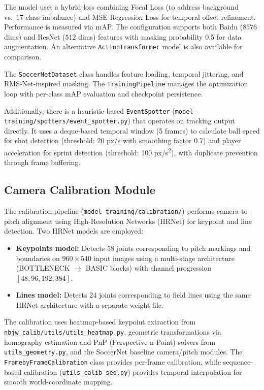 \documentclass[10pt,twocolumn,a4paper]{article}
\begin{document}
The model uses a hybrid loss combining Focal Loss (to address background vs.\ 17-class imbalance) and MSE Regression Loss for temporal offset refinement. Performance is measured via mAP. The configuration supports both Baidu ($8576$ dims) and ResNet ($512$ dims) features with masking probability 0.5 for data augmentation. An alternative \texttt{ActionTransformer} model is also available for comparison.

The \texttt{SoccerNetDataset} class handles feature loading, temporal jittering, and RMS-Net-inspired masking. The \texttt{TrainingPipeline} manages the optimization loop with per-class mAP evaluation and checkpoint persistence.

Additionally, there is a heuristic-based \texttt{EventSpotter} (\texttt{model-training/spotters/event\_spotter.py}) that operates on tracking output directly. It uses a deque-based temporal window (5 frames) to calculate ball speed for shot detection (threshold: 20 px/s with smoothing factor 0.7) and player acceleration for sprint detection (threshold: 100 px/s\textsuperscript{2}), with duplicate prevention through frame buffering.

\subsection{Camera Calibration Module}

The calibration pipeline (\texttt{model-training/calibration/}) performs camera-to-pitch alignment using High-Resolution Networks (HRNet) for keypoint and line detection. Two HRNet models are employed:

\begin{itemize}[noitemsep,topsep=0pt]
  \item \textbf{Keypoints model:} Detects 58 joints corresponding to pitch markings and boundaries on $960 \times 540$ input images using a multi-stage architecture (BOTTLENECK $\rightarrow$ BASIC blocks) with channel progression $[48, 96, 192, 384]$.
  \item \textbf{Lines model:} Detects 24 joints corresponding to field lines using the same HRNet architecture with a separate weight file.
\end{itemize}

The calibration uses heatmap-based keypoint extraction from \texttt{nbjw\_calib/utils/utils\_heatmap.py}, geometric transformations via homography estimation and PnP (Perspective-n-Point) solvers from \texttt{utils\_geometry.py}, and the SoccerNet baseline camera/pitch modules. The \texttt{FramebyFrameCalibration} class provides per-frame calibration, while sequence-based calibration (\texttt{utils\_calib\_seq.py}) provides temporal interpolation for smooth world-coordinate mapping.
\end{document}

